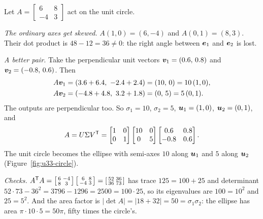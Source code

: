 \begin{example}\label{ex:u33-short}
Let $A=\begin{bmatrix}6&8\\-4&3\end{bmatrix}$ act on the unit circle.

\emph{The ordinary axes get skewed.} $A(1,0)=(6,-4)$ and $A(0,1)=(8,3)$. Their dot product is
$48-12=36\ne0$: the right angle between $\boldsymbol{e}_1$ and $\boldsymbol{e}_2$ is lost.

\emph{A better pair.} Take the perpendicular unit vectors $\boldsymbol{v}_1=(0.6,\,0.8)$ and
$\boldsymbol{v}_2=(-0.8,\,0.6)$. Then
\begin{align*}
  A\boldsymbol{v}_1&=(3.6+6.4,\ -2.4+2.4)=(10,\,0)=10\,(1,0),\\
  A\boldsymbol{v}_2&=(-4.8+4.8,\ 3.2+1.8)=(0,\,5)=5\,(0,1).
\end{align*}
The outputs are perpendicular too. So $\sigma_1=10$, $\sigma_2=5$, $\boldsymbol{u}_1=(1,0)$, $\boldsymbol{u}_2=(0,1)$, and
\[
  A=U\Sigma V^{\mathsf{T}}=\begin{bmatrix}1&0\\0&1\end{bmatrix}\begin{bmatrix}10&0\\0&5\end{bmatrix}
  \begin{bmatrix}0.6&0.8\\-0.8&0.6\end{bmatrix}.
\]
The unit circle becomes the ellipse with semi-axes $10$ along $\boldsymbol{u}_1$ and $5$ along $\boldsymbol{u}_2$
(Figure~\ref{fig:u33-circle}).

\emph{Checks.} $A^{\mathsf{T}} A=\left[\begin{smallmatrix}6&-4\\8&3\end{smallmatrix}\right]\left[\begin{smallmatrix}6&8\\-4&3\end{smallmatrix}\right]
=\left[\begin{smallmatrix}52&36\\36&73\end{smallmatrix}\right]$ has trace $125=100+25$ and determinant
$52\cdot73-36^2=3796-1296=2500=100\cdot25$, so its eigenvalues are $100=10^2$ and $25=5^2$. And the
area factor is $|\det A|=|18+32|=50=\sigma_1\sigma_2$: the ellipse has area $\pi\cdot10\cdot5=50\pi$,
fifty times the circle's.
\end{example}

